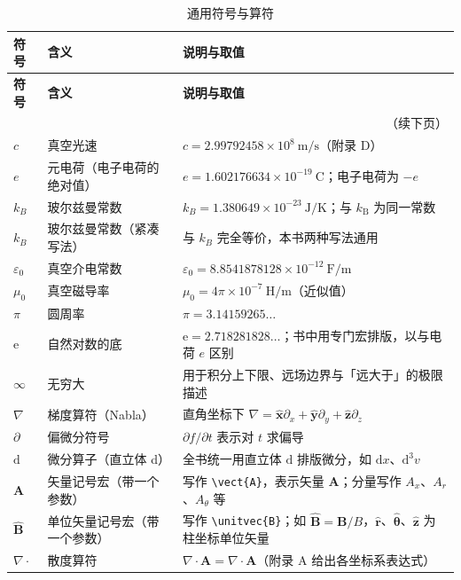 \documentclass[12pt,a4paper,openany,oneside]{book}
\newcommand{\diff}{\mathrm{d}}
\newcommand{\ee}{\mathrm{e}}
\newcommand{\eps}{\varepsilon}
\newcommand{\vect}[1]{\bm{#1}}
\newcommand{\unitvec}[1]{\hat{\vect{#1}}}
\newcommand{\divg}{\nabla\cdot}
\begin{document}
{\scriptsize
\setlength{\tabcolsep}{3pt}
\renewcommand{\arraystretch}{0.85}
\begin{longtable}{@{}p{1.7cm}p{4.2cm}p{8.7cm}@{}}
\caption{通用符号与算符}
\label{tab:general-symbols}\\
\toprule
\textbf{符号} & \textbf{含义} & \textbf{说明与取值} \\
\midrule
\endfirsthead
\toprule
\textbf{符号} & \textbf{含义} & \textbf{说明与取值} \\
\midrule
\endhead
\midrule
\multicolumn{3}{r}{\small（续下页）} \\
\endfoot
\bottomrule
\endlastfoot
$c$ & 真空光速 & $c = 2.99792458\times10^{8}\ \mathrm{m/s}$（附录 D） \\
$e$ & 元电荷（电子电荷的绝对值） & $e = 1.602176634\times10^{-19}\ \mathrm{C}$；电子电荷为 $-e$ \\
$k_{B}$ & 玻尔兹曼常数 & $k_{B} = 1.380649\times10^{-23}\ \mathrm{J/K}$；与 $k_\mathrm{B}$ 为同一常数 \\
$k_B$ & 玻尔兹曼常数（紧凑写法） & 与 $k_{B}$ 完全等价，本书两种写法通用 \\
$\eps_0$ & 真空介电常数 & $\eps_0 = 8.8541878128\times10^{-12}\ \mathrm{F/m}$ \\
$\mu_0$ & 真空磁导率 & $\mu_0 = 4\pi\times10^{-7}\ \mathrm{H/m}$（近似值） \\
$\pi$ & 圆周率 & $\pi = 3.14159265\ldots$ \\
$\ee$ & 自然对数的底 & $\ee = 2.718281828\ldots$；书中用专门宏排版，以与电荷 $e$ 区别 \\
$\infty$ & 无穷大 & 用于积分上下限、远场边界与「远大于」的极限描述 \\
$\nabla$ & 梯度算符（Nabla） & 直角坐标下 $\nabla = \unitvec{x}\partial_x + \unitvec{y}\partial_y + \unitvec{z}\partial_z$ \\
$\partial$ & 偏微分符号 & $\partial f/\partial t$ 表示对 $t$ 求偏导 \\
$\diff$ & 微分算子（直立体 d） & 全书统一用直立体 $\diff$ 排版微分，如 $\diff x$、$\diff^3v$ \\
$\vect{A}$ & 矢量记号宏（带一个参数） & 写作 \texttt{\textbackslash vect\{A\}}，表示矢量 $\bm{A}$；分量写作 $A_x$、$A_r$、$A_\theta$ 等 \\
$\unitvec{B}$ & 单位矢量记号宏（带一个参数） & 写作 \texttt{\textbackslash unitvec\{B\}}；如 $\unitvec{B} = \vect{B}/B$，$\unitvec{r}$、$\unitvec{\theta}$、$\unitvec{z}$ 为柱坐标单位矢量 \\
$\divg$ & 散度算符 & $\divg\vect{A} = \nabla\cdot\vect{A}$（附录 A 给出各坐标系表达式） \\

\end{longtable}}
\end{document}

